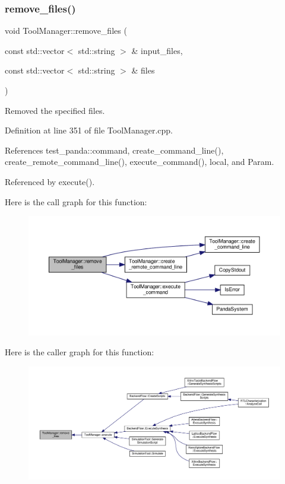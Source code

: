 \subsubsection{\texorpdfstring{remove\+\_\+files()}{remove\_files()}}
{\footnotesize\ttfamily void Tool\+Manager\+::remove\+\_\+files (\begin{DoxyParamCaption}\item[{const std\+::vector$<$ std\+::string $>$ \&}]{input\+\_\+files,  }\item[{const std\+::vector$<$ std\+::string $>$ \&}]{files }\end{DoxyParamCaption})\hspace{0.3cm}{\ttfamily [protected]}}



Removed the specified files. 



Definition at line 351 of file Tool\+Manager.\+cpp.



References test\+\_\+panda\+::command, create\+\_\+command\+\_\+line(), create\+\_\+remote\+\_\+command\+\_\+line(), execute\+\_\+command(), local, and Param.



Referenced by execute().

Here is the call graph for this function\+:
\nopagebreak
\begin{figure}[H]
\begin{center}
\leavevmode
\includegraphics[width=350pt]{dc/dc5/classToolManager_a9fa29cf550d563627666c294e8a38855_cgraph}
\end{center}
\end{figure}
Here is the caller graph for this function\+:
\nopagebreak
\begin{figure}[H]
\begin{center}
\leavevmode
\includegraphics[width=350pt]{dc/dc5/classToolManager_a9fa29cf550d563627666c294e8a38855_icgraph}
\end{center}
\end{figure}


